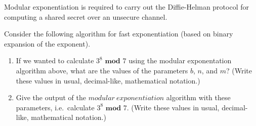 
Modular exponentiation is required to carry out the Diffie-Helman protocol for 
computing a shared secret over an unsecure channel.

Consider the following algorithm for fast exponentiation (based on binary 
expansion of the exponent).

  
    
    \begin{enumerate}
        \item If we wanted to calculate $3^8 \textbf{ mod } 7$ 
        using the modular exponentation algorithm above, what are the values of 
        the parameters $b$, $n$, and $m$?  (Write these values in usual, 
        decimal-like, mathematical notation.)
        \item Give the output of the $modular~exponentiation$ algorithm 
        with these parameters, i.e.\ calculate $3^8 \textbf{ mod } 7$.
        (Write these values in usual, 
        decimal-like, mathematical notation.)
    \end{enumerate}